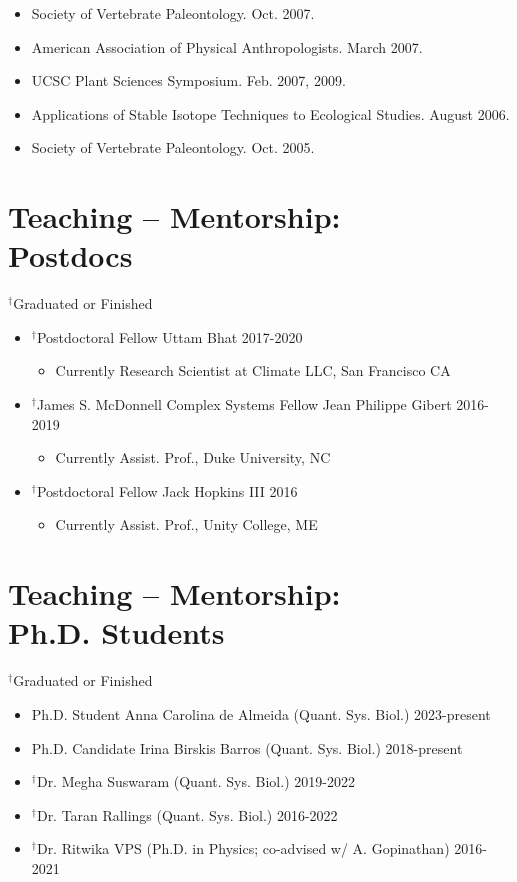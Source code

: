 \documentclass[margin,line,12pt]{res}
\begin{document}
\begin{resume}
\begin{itemize}
\item Society of Vertebrate Paleontology. Oct. 2007.

\item American Association of Physical Anthropologists. March 2007.

\item UCSC Plant Sciences Symposium. Feb. 2007, 2009.

\item Applications of Stable Isotope Techniques to Ecological Studies. August 2006.

\item Society of Vertebrate Paleontology. Oct. 2005.

\end{itemize}

\section{\sc Teaching -- Mentorship: \\ Postdocs}
{\footnotesize{${}^\dag$Graduated or Finished}}
\begin{itemize}
\item ${}^\dag$Postdoctoral Fellow Uttam Bhat \hfill 2017-2020
	\begin{itemize}  
		\item[] Currently Research Scientist at Climate LLC, San Francisco CA
	\end{itemize}
\item ${}^\dag$James S. McDonnell Complex Systems Fellow Jean Philippe Gibert \hfill 2016-2019
	\begin{itemize}  
		\item[] Currently Assist. Prof., Duke University, NC
	\end{itemize}  
\item ${}^\dag$Postdoctoral Fellow Jack Hopkins III \hfill 2016
	\begin{itemize}  
		\item[] Currently Assist. Prof., Unity College, ME
	\end{itemize}  
\end{itemize}

\section{\sc Teaching -- Mentorship: \\ Ph.D. Students}
{\footnotesize{${}^\dag$Graduated or Finished}}
\begin{itemize}
  \item Ph.D. Student Anna Carolina de Almeida (Quant. Sys. Biol.) \hfill 2023-present
  \item Ph.D. Candidate Irina Birskis Barros (Quant. Sys. Biol.) \hfill 2018-present
  \item ${}^\dag$Dr. Megha Suswaram (Quant. Sys. Biol.) \hfill 2019-2022
  \item ${}^\dag$Dr. Taran Rallings (Quant. Sys. Biol.) \hfill 2016-2022
  \item ${}^\dag$Dr. Ritwika VPS (Ph.D. in Physics; co-advised w/ A. Gopinathan) \hfill 2016-2021



\end{itemize}
\end{resume}
\end{document}
